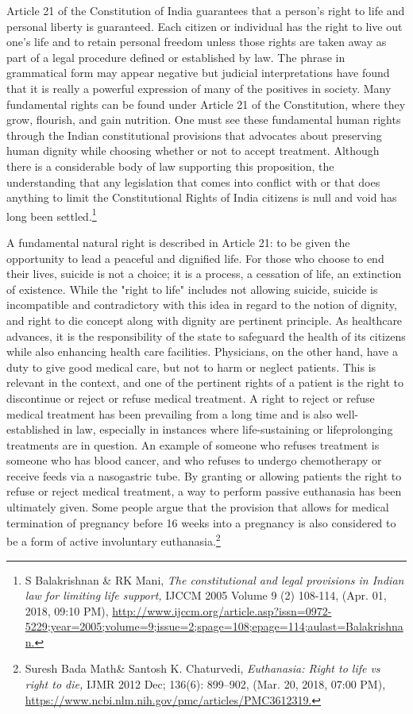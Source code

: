 \begin{multicols}{2}
\noi
Article 21 of the Constitution of India guarantees that a person's right to life and personal
liberty is guaranteed. Each citizen or individual has the right to live out one’s life and to
retain personal freedom unless those rights are taken away as part of a legal procedure
defined or established by law. The phrase in grammatical form may appear negative but
judicial interpretations have found that it is really a powerful expression of many of the
positives in society. Many fundamental rights can be found under Article 21 of the
Constitution, where they grow, flourish, and gain nutrition. One must see these fundamental
human rights through the Indian constitutional provisions that advocates about preserving
human dignity while choosing whether or not to accept treatment. Although there is a
considerable body of law supporting this proposition, the understanding that any legislation
that comes into conflict with or that does anything to limit the Constitutional Rights of India
citizens is null and void has long been settled.\footnote{S Balakrishnan \& RK Mani, \textit{The constitutional and legal provisions in Indian law for limiting life support,} IJCCM 2005 Volume 9 (2) 108-114, (Apr. 01, 2018, 09:10 PM), \url{http://www.ijccm.org/article.asp?issn=0972-5229;year=2005;volume=9;issue=2;spage=108;epage=114;aulast=Balakrishnan.}}

\noi
A fundamental natural right is described in Article 21: to be given the opportunity to lead a
peaceful and dignified life. For those who choose to end their lives, suicide is not a choice; it
is a process, a cessation of life, an extinction of existence. While the "right to life" includes
not allowing suicide, suicide is incompatible and contradictory with this idea in regard to the
notion of dignity, and right to die concept along with dignity are pertinent principle. As
healthcare advances, it is the responsibility of the state to safeguard the health of its citizens
while also enhancing health care facilities. Physicians, on the other hand, have a duty to give
good medical care, but not to harm or neglect patients. This is relevant in the context, and one
of the pertinent rights of a patient is the right to discontinue or reject or refuse medical
treatment. A right to reject or refuse medical treatment has been prevailing from a long time
and is also well-established in law, especially in instances where life-sustaining or lifeprolonging treatments are in question. An example of someone who refuses treatment is
someone who has blood cancer, and who refuses to undergo chemotherapy or receive feeds
via a nasogastric tube. By granting or allowing patients the right to refuse or reject medical 
treatment, a way to perform passive euthanasia has been ultimately given. Some people argue
that the provision that allows for medical termination of pregnancy before 16 weeks into a
pregnancy is also considered to be a form of active involuntary euthanasia.\footnote{Suresh Bada Math\& Santosh K. Chaturvedi, \textit{Euthanasia: Right to life vs right to die,} IJMR 2012 Dec; 136(6): 899–902, (Mar. 20, 2018, 07:00 PM), \url{https://www.ncbi.nlm.nih.gov/pmc/articles/PMC3612319.}}


\end{multicols}
